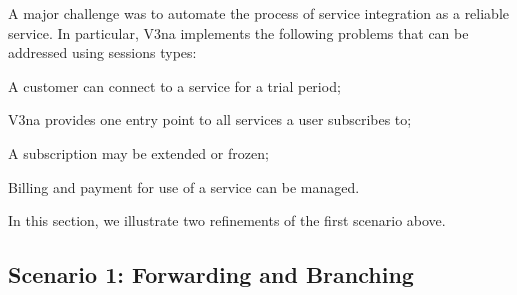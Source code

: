 \documentclass[10pt]{llncs}
\begin{document}
A major challenge was to automate the process of service integration as a reliable service.
In particular, V3na implements the following problems that can be addressed using sessions types:
%
\begin{compactitem}
\item  A customer can connect to a service for a trial period; %

\item  V3na provides one entry point to all services a user subscribes to;

\item  A subscription may be extended or frozen;

\item  Billing and payment for use of a service can be managed.
\end{compactitem}
In this section, we illustrate two refinements of the first scenario above.



\subsection{Scenario 1: Forwarding and Branching}
\end{document}
